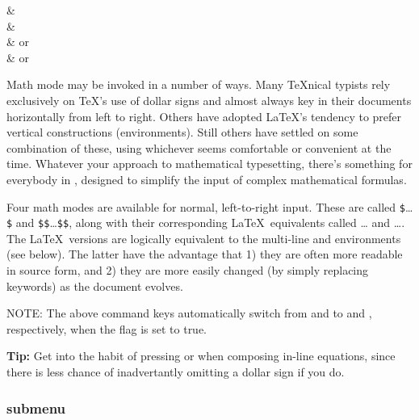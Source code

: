 \documentclass{report}
\begin{document}
\begin{commands}
	 &  \\
	 &  \\
	 &  or  \\
	 &  or 
\end{commands}
Math mode may be invoked in a number of ways.  Many \TeX nical typists 
rely exclusively on \TeX's use of dollar signs and almost always key 
in their documents horizontally from left to right.  Others have 
adopted \LaTeX's tendency to prefer vertical constructions 
(environments).  Still others have settled on some combination of 
these, using whichever seems comfortable or convenient at the time.  
Whatever your approach to mathematical typesetting, there's something 
for everybody in , designed to simplify the input 
of complex mathematical formulas.

Four math modes are available for normal, left-to-right input.  These 
are called  \verb|$|\ldots\verb|$| and  \verb|$$|\ldots\verb|$$|, along with their 
corresponding \LaTeX\ equivalents called  
\cmd{(}\ldots\cmd{)} and  
\cmd{[}\ldots\cmd{]}.  The \LaTeX\ versions are logically equivalent 
to the multi-line  and  environments (see 
below).  The latter have the advantage that 1) they are often more 
readable in source form, and 2) they are more easily changed (by 
simply replacing keywords) as the document evolves.

NOTE: The above command keys automatically switch from 
 and  to  and 
, respectively, when the flag 
 is set to true.

\textbf{Tip:} Get into the habit of pressing  or 
 when composing in-line equations, since there is 
less chance of inadvertantly omitting a dollar sign if you do.

\subsubsection{ submenu}
\end{document}
